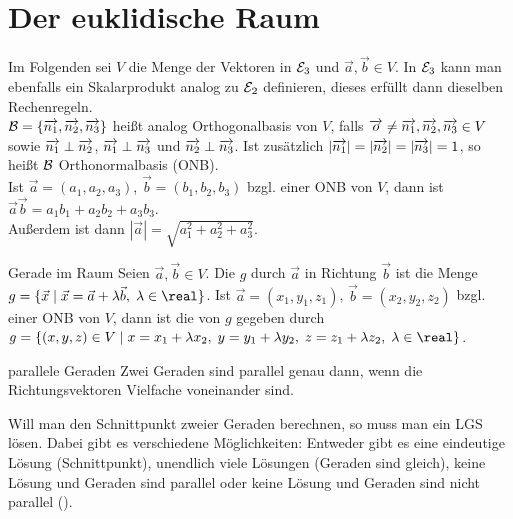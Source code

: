 \section{%
    Der euklidische Raum%
}


\begin{Bem}
    Im Folgenden sei $V$ die Menge der Vektoren in $\mathcal{E}_3$ und
    $\vec{a}, \vec{b} \in V$.
    In $\mathcal{E}_3$ kann man ebenfalls ein Skalarprodukt analog zu $\mathcal{E}_2$
    definieren, dieses erfüllt dann dieselben Rechenregeln. \\
    $\mathcal{B} = \{\overrightarrow{n_1}, \overrightarrow{n_2}, \overrightarrow{n_3}\}$ heißt analog
    Orthogonalbasis von $V$, falls
    $\overrightarrow{o} \not= \overrightarrow{n_1}, \overrightarrow{n_2}, \overrightarrow{n_3} \in V$ sowie
    $\overrightarrow{n_1} \;\bot\; \overrightarrow{n_2}$, $\overrightarrow{n_1} \;\bot\; \overrightarrow{n_3}$ und
    $\overrightarrow{n_2} \;\bot\; \overrightarrow{n_3}$.
    Ist zusätzlich $|\overrightarrow{n_1}| = |\overrightarrow{n_2}| = |\overrightarrow{n_3}| = 1$,
    so heißt $\mathcal{B}$ Orthonormalbasis (ONB). \\
    Ist $\vec{a} = (a_1, a_2, a_3)$, $\vec{b} = (b_1, b_2, b_3)$ bzgl. einer
    ONB von $V$, dann ist
    $\vec{a} \vec{b} = a_1 b_1 + a_2 b_2 + a_3 b_3$. \\
    Außerdem ist dann $|\vec{a}| = \sqrt{a_1^2 + a_2^2 + a_3^2}$.
\end{Bem}

\begin{Def}{Gerade im Raum}
    Seien $\vec{a}, \vec{b} \in V$.
    Die  $g$ durch $\vec{a}$ in Richtung $\vec{b}$ ist die
    Menge $g = \{\vec{x} \;|\; \vec{x} = \vec{a} + \lambda \vec{b},\;
    \lambda \in \real\}$.
    Ist $\vec{a} = (x_1, y_1, z_1)$, $\vec{b} = (x_2, y_2, z_2)$ bzgl. einer
    ONB von $V$, dann ist die  von $g$ gegeben
    durch $g = \{(x, y, z) \in V \;|\; x = x_1 + \lambda x_2,\;
    y = y_1 + \lambda y_2,\; z = z_1 + \lambda z_2,\; \lambda \in \real\}$.
\end{Def}

\begin{Lemma}{parallele Geraden}
    Zwei Geraden sind parallel genau dann, wenn die Richtungsvektoren Vielfache
    voneinander sind.
\end{Lemma}

\pagebreak

\begin{Bem}
    Will man den Schnittpunkt zweier Geraden berechnen, so muss man ein LGS
    lösen.
    Dabei gibt es verschiedene Möglichkeiten:
    Entweder gibt es eine eindeutige Lösung (Schnittpunkt), unendlich
    viele Lösungen (Geraden sind gleich), keine Lösung und Geraden sind
    parallel oder keine Lösung und Geraden sind nicht parallel
    ().
\end{Bem}


